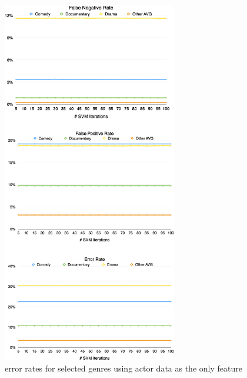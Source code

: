 \documentclass{vldb}
\begin{document}
\begin{figure}
\begin{center}
\includegraphics[width=3.00in]{ActorsErrorRates.png}
\caption{error rates for selected genres using actor data as the only feature}
\label{fig:ErrorRatesActors}
\end{center}
\end{figure}
\end{document}
